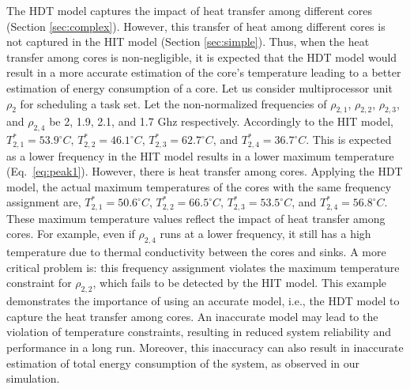 \documentclass[conference]{IEEEtran}
\begin{document}
The HDT model captures the impact of heat transfer among different cores (Section \ref{sec:complex}).
However, this transfer of heat among different cores is not captured in the HIT model (Section \ref{sec:simple}).
Thus, when the heat transfer among cores is non-negligible, it is expected that the HDT model would result in a more accurate estimation of the core's temperature
leading to a better estimation of 
energy consumption of a core. Let us consider multiprocessor unit $\rho_2$ for scheduling a task set. Let the non-normalized frequencies of $\rho_{2,1}$, $\rho_{2,2}$,
$\rho_{2,3}$, and $\rho_{2,4}$ be 2, 1.9, 2.1, and 1.7 Ghz respectively. Accordingly to the HIT model, $T^*_{2,1}=53.9^\circ C$,  $T^*_{2,2}=46.1^\circ C$,
$T^*_{2,3}=62.7^\circ C$, and  $T^*_{2,4}=36.7^\circ C$. This is expected as a lower frequency in the HIT model results in a lower maximum temperature (Eq.~\ref{eq:peak1}).
%
%
However, there is heat transfer among cores. Applying the HDT model, the actual maximum temperatures of the cores with the same frequency assignment are,
$T^*_{2,1}=50.6^\circ C$,  $T^*_{2,2}=66.5^\circ C$, $T^*_{2,3}=53.5^\circ C$, and  $T^*_{2,4}=56.8^\circ C$.
These maximum temperature values reflect the impact of heat transfer among cores. For example, even if $\rho_{2,4}$ runs at a lower frequency,
it still has a high temperature due to thermal conductivity between the cores and sinks. A more critical problem is: this frequency assignment violates the
maximum temperature constraint for $\rho_{2,2}$, which fails to be detected by the HIT model.
%
%
This example demonstrates the importance of using an accurate model, i.e., the HDT model to capture the heat transfer among cores. An inaccurate model may lead to the violation of temperature constraints, resulting in reduced system reliability and performance in a long run.  
Moreover, this inaccuracy can also result in inaccurate estimation of total energy consumption of the system, as observed in our simulation. 


\end{document}
